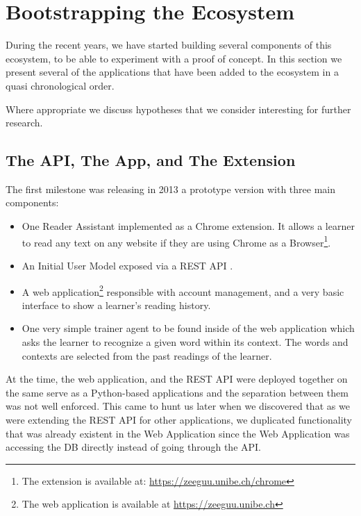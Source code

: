 

\section {Bootstrapping the Ecosystem}

During the recent years, we have started building several components of this ecosystem, to be able to experiment with a proof of concept. In this section we present several of the applications that have been added to the ecosystem in a quasi chronological order. 

Where appropriate we discuss hypotheses that we consider interesting for further research. 

\subsection {The API, The App, and The Extension}
The first milestone was releasing in 2013 a prototype version with three main components: 

\begin{itemize}
	\item One Reader Assistant implemented as a Chrome extension. It allows a learner to read any text on any website if they are using Chrome as a Browser\footnote{The extension is available at: \url{https://zeeguu.unibe.ch/chrome}}. 

	\item An Initial User Model exposed via a REST API  \cite{Lung16zeeguu}. 

	\item A web application\footnote{The web application is available at \url{https://zeeguu.unibe.ch}} responsible with account management, and a very basic interface to show a learner's reading history. 

	\item One very simple trainer agent to be found inside of the web application which asks the learner to recognize a given word within its context. The words and contexts are selected from the past readings of the learner.

\end{itemize}

At the time, the web application, and the REST API were deployed together on the same serve as a Python-based applications and the separation between them was not well enforced. This came to hunt us later when we discovered that as we were extending the REST API for other applications, we duplicated functionality that was already existent in the Web Application since the Web Application was accessing the DB directly instead of going through the API.

